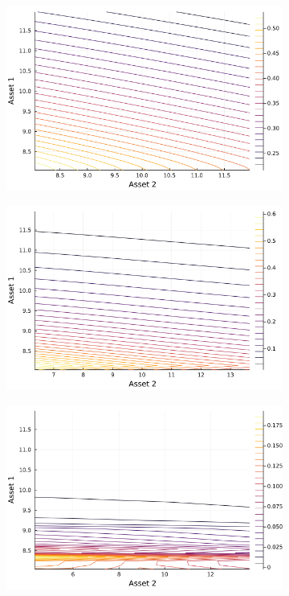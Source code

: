 \documentclass{article}
\begin{document}
\begin{figure}
    \centering
    \begin{subfigure}{0.4\textwidth}
        \includegraphics[width=\textwidth]{../plots/params/baseline/b12.png}
        \end{subfigure}
    \begin{subfigure}{0.4\textwidth}
        \includegraphics[width=\textwidth]{../plots/params/a2-mean-shift/b12.png}
    \end{subfigure}
    \begin{subfigure}{0.4\textwidth}
        \includegraphics[width=\textwidth]{../plots/params/a2-meanvar-shift/b12.png}

\end{subfigure}
\end{figure}
\end{document}
